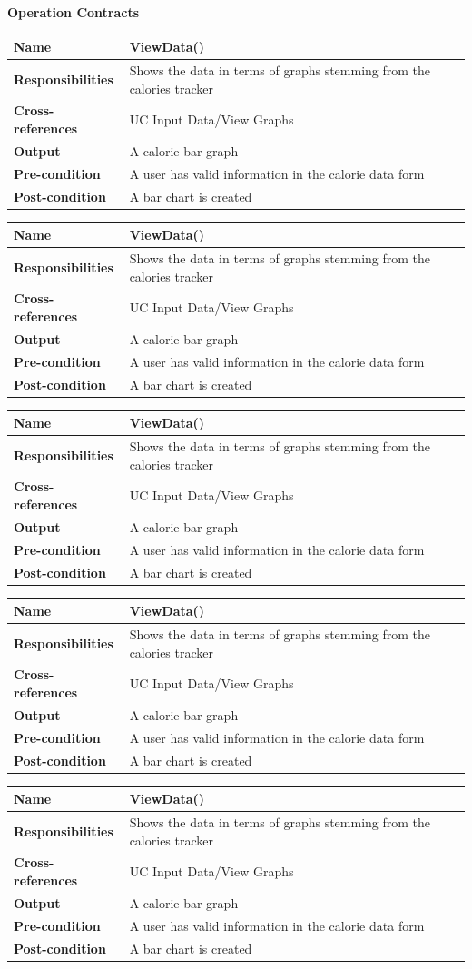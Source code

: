 \documentclass[10pt]{article}
\begin{document}
\textbf{Operation Contracts}
\begin{longtable}[]{@{}ll@{}}
\toprule
\textbf{Name} & \textbf{ViewData()}\tabularnewline
\midrule
\endhead
\textbf{Responsibilities} & Shows the data in terms of graphs stemming
from the calories tracker\tabularnewline
\textbf{Cross-references} & UC Input Data/View Graphs\tabularnewline
\textbf{Output} & A calorie bar graph\tabularnewline
\textbf{Pre-condition} & A user has valid information in the calorie
data form\tabularnewline
\textbf{Post-condition} & A bar chart is created\tabularnewline
\bottomrule
\end{longtable}
\begin{longtable}[]{@{}ll@{}}
\toprule
\textbf{Name} & \textbf{ViewData()}\tabularnewline
\midrule
\endhead
\textbf{Responsibilities} & Shows the data in terms of graphs stemming
from the calories tracker\tabularnewline
\textbf{Cross-references} & UC Input Data/View Graphs\tabularnewline
\textbf{Output} & A calorie bar graph\tabularnewline
\textbf{Pre-condition} & A user has valid information in the calorie
data form\tabularnewline
\textbf{Post-condition} & A bar chart is created\tabularnewline
\bottomrule
\end{longtable}
\begin{longtable}[]{@{}ll@{}}
\toprule
\textbf{Name} & \textbf{ViewData()}\tabularnewline
\midrule
\endhead
\textbf{Responsibilities} & Shows the data in terms of graphs stemming
from the calories tracker\tabularnewline
\textbf{Cross-references} & UC Input Data/View Graphs\tabularnewline
\textbf{Output} & A calorie bar graph\tabularnewline
\textbf{Pre-condition} & A user has valid information in the calorie
data form\tabularnewline
\textbf{Post-condition} & A bar chart is created\tabularnewline
\bottomrule
\end{longtable}
\begin{longtable}[]{@{}ll@{}}
\toprule
\textbf{Name} & \textbf{ViewData()}\tabularnewline
\midrule
\endhead
\textbf{Responsibilities} & Shows the data in terms of graphs stemming
from the calories tracker\tabularnewline
\textbf{Cross-references} & UC Input Data/View Graphs\tabularnewline
\textbf{Output} & A calorie bar graph\tabularnewline
\textbf{Pre-condition} & A user has valid information in the calorie
data form\tabularnewline
\textbf{Post-condition} & A bar chart is created\tabularnewline
\bottomrule
\end{longtable}
\begin{longtable}[]{@{}ll@{}}
\toprule
\textbf{Name} & \textbf{ViewData()}\tabularnewline
\midrule
\endhead
\textbf{Responsibilities} & Shows the data in terms of graphs stemming
from the calories tracker\tabularnewline
\textbf{Cross-references} & UC Input Data/View Graphs\tabularnewline
\textbf{Output} & A calorie bar graph\tabularnewline
\textbf{Pre-condition} & A user has valid information in the calorie
data form\tabularnewline
\textbf{Post-condition} & A bar chart is created\tabularnewline
\bottomrule
\end{longtable}
\end{document}
